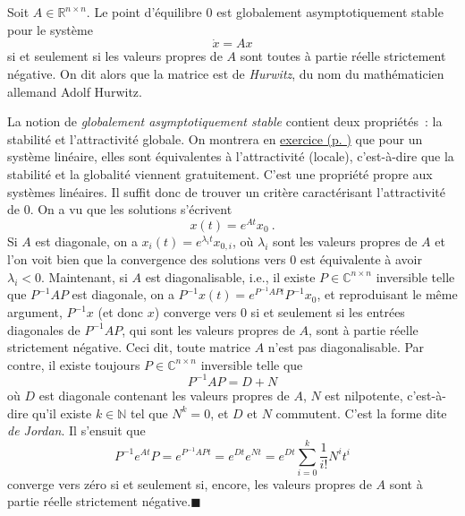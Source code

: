 \hypertarget{Hurwitz}{}
\begin{theoreme}\label{Hurwitz}
Soit \(A\in \mathbb{R}^{n\times n}\). Le point d'équilibre 0 est
globalement asymptotiquement stable pour le système \[
\dot{x} = Ax
\] si et seulement si les valeurs propres de \(A\) sont toutes à partie
réelle strictement négative. On dit alors que la matrice est de
\emph{Hurwitz}, du nom du mathématicien allemand Adolf Hurwitz.
\end{theoreme}

\hypertarget{duxe9monstration-6}{}
\begin{preuve}\label{duxe9monstration-6}
La notion de \emph{globalement asymptotiquement stable} contient deux
propriétés~: la stabilité et l'attractivité globale. On montrera en
\protect\hyperlink{attrac_stab}{exercice (p. \pageref*{attrac_stab})}
que pour un système linéaire, elles sont équivalentes à l'attractivité
(locale), c'est-à-dire que la stabilité et la globalité viennent
gratuitement. C'est une propriété propre aux systèmes linéaires. Il
suffit donc de trouver un critère caractérisant l'attractivité de 0. On
a vu que les solutions s'écrivent \[
x(t)= e^{At} x_0 \ .
\] Si \(A\) est diagonale, on a \(x_i(t)=e^{\lambda_i t}x_{0,i}\), où
\(\lambda_i\) sont les valeurs propres de \(A\) et l'on voit bien que la
convergence des solutions vers 0 est équivalente à avoir
\(\lambda_i<0\). Maintenant, si \(A\) est diagonalisable, i.e., il
existe \(P\in \mathbb{C}^{n\times n}\) inversible telle que
\(P^{-1} A P\) est diagonale, on a
\(P^{-1} x(t) = e^{P^{-1} A P t} P^{-1} x_0\), et reproduisant le
même argument, \(P^{-1} x\) (et donc \(x\)) converge vers 0 si et
seulement si les entrées diagonales de \(P^{-1} A P\), qui sont les
valeurs propres de \(A\), sont à partie réelle strictement négative.
Ceci dit, toute matrice \(A\) n'est pas diagonalisable. Par contre, il
existe toujours \(P\in \mathbb{C}^{n\times n}\) inversible telle que \[
P^{-1} A P = D + N
\] où \(D\) est diagonale contenant les valeurs propres de \(A\), \(N\)
est nilpotente, c'est-à-dire qu'il existe \(k\in \mathbb{N}\) tel que
\(N^k=0\), et \(D\) et \(N\) commutent. C'est la forme dite \emph{de
Jordan}. Il s'ensuit que \[
P^{-1} e^{At} P = e^{P^{-1} A Pt} = e^{Dt}e^{Nt} = e^{Dt}\sum_{i=0}^k \frac{1}{i!} N^i t^i
\] converge vers zéro si et seulement si, encore, les valeurs propres de
\(A\) sont à partie réelle strictement négative.\hfill$\blacksquare$


\end{preuve}
